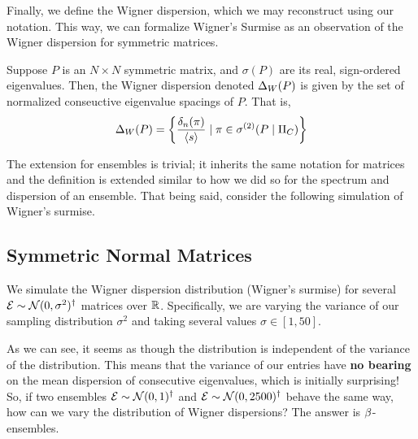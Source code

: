 Finally, we define the Wigner dispersion, which we may reconstruct using our notation. This way, we can formalize Wigner's Surmise as
an observation of the Wigner dispersion for symmetric matrices.

\begin{definition}
Suppose $P$ is an $N \times N$ symmetric matrix, and $\sigma(P)$ are its real, sign-ordered eigenvalues.
Then, the Wigner dispersion denoted $\Delta_{W}(P)$ is given by the set of normalized conseuctive eigenvalue spacings of $P$. That is,
$$ \Delta_{W}(P) = \left\{ \frac{\delta_n(\pi)}{{\langle s \rangle}} \mid \pi \in {\sigma^{(2)}}(P \mid \Pi_C) \right\} $$
\end{definition}

The extension for ensembles is trivial; it inherits the same notation for matrices and the definition is extended similar to how we
did so for the spectrum and dispersion of an ensemble. That being said, consider the following simulation of Wigner's surmise.

\newpage


\subsection{Symmetric Normal Matrices}

We simulate the Wigner dispersion distribution (Wigner's surmise) for several $\mathcal{E} \sim \mathcal{N}(0, \sigma^2)^\dagger$ matrices over $\mathbb{R}$.
Specifically, we are varying the variance of our sampling distribution $\sigma^2$ and taking several values $\sigma \in  [1, 50]$.



As we can see, it seems as though the distribution is independent of the variance of the distribution.
This means that the variance of our entries have \textbf{no bearing} on the mean dispersion of consecutive eigenvalues, which is initially surprising!
So, if two ensembles $\mathcal{E} \sim \mathcal{N}(0,1)^\dagger$ and $\mathcal{E} \sim \mathcal{N}(0,2500)^\dagger$ behave the same way, how can we vary the distribution of Wigner dispersions?
The answer is $\beta$-ensembles. \newline

